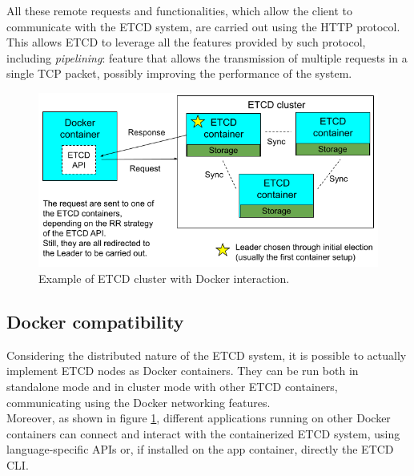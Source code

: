 All these remote requests and functionalities, which allow the client to communicate with the ETCD system, are carried out using the HTTP protocol. This allows ETCD to leverage all the features provided by such protocol, including \textit{pipelining}: feature that allows the transmission of multiple requests in a single TCP packet, possibly improving the performance of the system. \cite{site:http-pipelining}
\begin{figure}[h!]
	\centering
	\includegraphics[width=0.85\linewidth]{"immagini/Technologies/ETCD cluster"}
	\caption[Example of ETCD cluster with Docker interaction.]{Example of ETCD cluster with Docker interaction.}
	\label{fig:etcd-cluster}
\end{figure}

\subsection{Docker compatibility}
Considering the distributed nature of the ETCD system, it is possible to actually implement ETCD nodes as Docker containers. They can be run both in standalone mode and in cluster mode \cite{site:etcd-docker} with other ETCD containers, communicating using the Docker networking features. \\
Moreover, as shown in figure \ref{fig:etcd-cluster}, different applications running on other Docker containers can connect and interact with the containerized ETCD system, using language-specific APIs or, if installed on the app container, directly the ETCD CLI.


